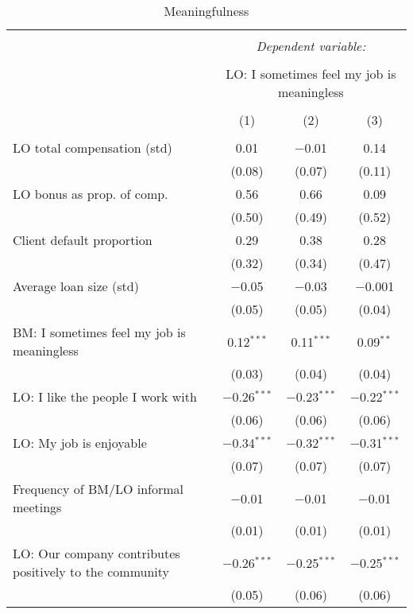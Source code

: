 \documentclass[11pt]{article}
\begin{document}
\begin{table}[!htbp] \centering 
  \caption{Meaningfulness} 
  \label{} 
\footnotesize 
\begin{tabular}{@{\extracolsep{5pt}}lccc} 
\\[-1.8ex]\hline 
\hline \\[-1.8ex] 
 & \multicolumn{3}{c}{\textit{Dependent variable:}} \\ 
\cline{2-4} 
\\[-1.8ex] & \multicolumn{3}{c}{LO: I sometimes feel my job is meaningless} \\ 
\\[-1.8ex] & (1) & (2) & (3)\\ 
\hline \\[-1.8ex] 
 LO total compensation (std) & 0.01 & $-$0.01 & 0.14 \\ 
  & (0.08) & (0.07) & (0.11) \\ 
  LO bonus as prop. of comp. & 0.56 & 0.66 & 0.09 \\ 
  & (0.50) & (0.49) & (0.52) \\ 
  Client default proportion & 0.29 & 0.38 & 0.28 \\ 
  & (0.32) & (0.34) & (0.47) \\ 
  Average loan size (std) & $-$0.05 & $-$0.03 & $-$0.001 \\ 
  & (0.05) & (0.05) & (0.04) \\ 
  BM: I sometimes feel my job is meaningless & 0.12$^{***}$ & 0.11$^{***}$ & 0.09$^{**}$ \\ 
  & (0.03) & (0.04) & (0.04) \\ 
  LO: I like the people I work with & $-$0.26$^{***}$ & $-$0.23$^{***}$ & $-$0.22$^{***}$ \\ 
  & (0.06) & (0.06) & (0.06) \\ 
  LO: My job is enjoyable & $-$0.34$^{***}$ & $-$0.32$^{***}$ & $-$0.31$^{***}$ \\ 
  & (0.07) & (0.07) & (0.07) \\ 
  Frequency of BM/LO informal meetings & $-$0.01 & $-$0.01 & $-$0.01 \\ 
  & (0.01) & (0.01) & (0.01) \\ 
  LO: Our company contributes positively to the community & $-$0.26$^{***}$ & $-$0.25$^{***}$ & $-$0.25$^{***}$ \\ 
  & (0.05) & (0.06) & (0.06) \\ 

\end{tabular}
\end{table}
\end{document}
